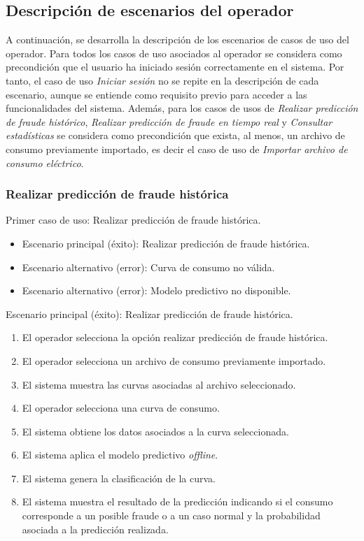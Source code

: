 \documentclass[12pt,a4paper]{report}
\begin{document}
\subsection{Descripción de escenarios del operador}

A continuación, se desarrolla la descripción de los escenarios de casos de uso del operador. Para todos los casos de uso asociados al operador se considera como precondición que el usuario ha iniciado sesión correctamente en el sistema. Por tanto, el caso de uso \emph{Iniciar sesión} no se repite en la descripción de cada escenario, aunque se entiende como requisito previo para acceder a las funcionalidades del sistema. Además, para los casos de usos de \emph{Realizar predicción de fraude histórico}, \emph{Realizar predicción de fraude en tiempo real} y \emph{Consultar estadísticas} se considera como precondición que exista, al menos, un archivo de consumo previamente importado, es decir el caso de uso de \emph{Importar archivo de consumo eléctrico}.


\subsubsection{Realizar predicción de fraude histórica}

\noindent Primer caso de uso: Realizar predicción de fraude histórica.

\begin{itemize}[leftmargin=1.5cm]
    \item Escenario principal (éxito): Realizar predicción de fraude histórica.
    \item Escenario alternativo (error): Curva de consumo no válida.
    \item Escenario alternativo (error): Modelo predictivo no disponible.
\end{itemize}

\medskip

\noindent Escenario principal (éxito): Realizar predicción de fraude histórica.

\begin{enumerate}[leftmargin=1.5cm]
    \item El operador selecciona la opción realizar predicción de fraude histórica.
    \item El operador selecciona un archivo de consumo previamente importado.
    \item El sistema muestra las curvas asociadas al archivo seleccionado.
    \item El operador selecciona una curva de consumo.
    \item El sistema obtiene los datos asociados a la curva seleccionada.
    \item El sistema aplica el modelo predictivo \emph{offline}.
    \item El sistema genera la clasificación de la curva.
    \item El sistema muestra el resultado de la predicción indicando si el consumo corresponde a un posible fraude o a un caso normal y la probabilidad asociada a la predicción realizada.
\end{enumerate}
\end{document}
